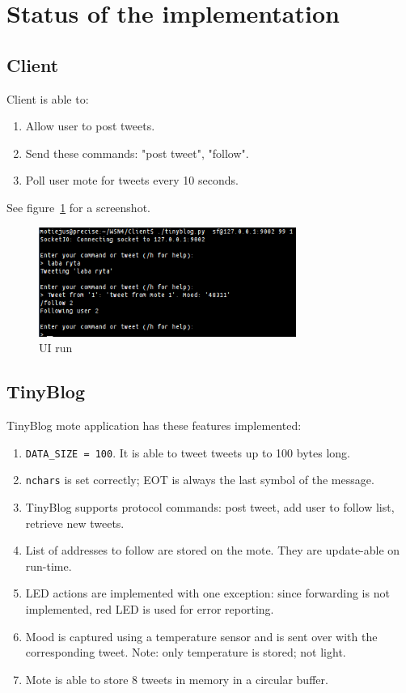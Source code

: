 \documentclass[english,11pt]{article}
\numberwithin{equation}{section}
\begin{document}
\section{Status of the implementation}

\subsection{Client}

Client is able to:
\begin{enumerate}
    \item Allow user to post tweets.
    \item Send these commands: "post tweet", "follow".
    \item Poll user mote for tweets every 10 seconds.
\end{enumerate}

See figure~\ref{fig:ui_run} for a screenshot.
\begin{figure}
    \centering
    \includegraphics[width=0.75\textwidth]{ui_run.png}
    \caption{UI run}
    \label{fig:ui_run}
\end{figure}

\subsection{TinyBlog}

TinyBlog mote application has these features implemented:
\begin{enumerate}
    \item \texttt{DATA\_SIZE = 100}. It is able to tweet tweets up to 100 bytes
        long.

    \item \texttt{nchars} is set correctly; EOT is always the last symbol of the
        message.
    \item TinyBlog supports protocol commands: post tweet, add user to follow
        list, retrieve new tweets.
    \item List of addresses to follow are stored on the mote. They are
        update-able on run-time.
    \item LED actions are implemented with one exception: since forwarding is
        not implemented, red LED is used for error reporting.
    \item Mood is captured using a temperature sensor and is sent over with the
        corresponding tweet. Note: only temperature is stored; not light.
    \item Mote is able to store 8 tweets in memory in a circular buffer.
\end{enumerate}
\end{document}
